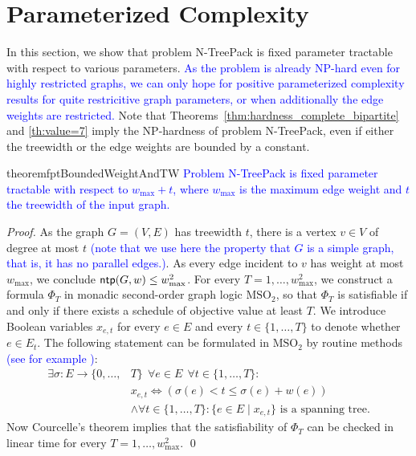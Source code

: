 \documentclass[runningheads]{llncs}
\newcommand{\set}[1]{\{ #1 \}}
\newcommand{\bigO}{\mathcal{O}}
\newcommand{\xxxNTP}{{\sc N-TreePack}}
\DeclareMathOperator{\ntp}{\text{\sf ntp}}
\newcommand{\lasse}[1]{\textcolor{blue}{#1}}
\begin{document}
\section{Parameterized Complexity}
\label{sec:parameterized}
In this section, we show that problem {\xxxNTP} is fixed parameter tractable with 
respect to various parameters. \lasse{As the problem is already NP-hard even for highly restricted graphs,
we can only hope for positive parameterized complexity results for quite restricitive graph parameters,
or when additionally the edge weights are restricted.}
Note that Theorems~\ref{thm:hardness_complete_bipartite} and \ref{th:value=7} imply the NP-hardness 
of problem {\xxxNTP}, even if either the treewidth or the edge weights are bounded by a constant. 

\begin{restatable}{theorem}{fptBoundedWeightAndTW}
\label{th:fpt_weights_and_tw_bounded}
\lasse{Problem {\xxxNTP} is fixed parameter tractable with respect to $w_{\max} + t$, where $w_{\max}$ is the maximum edge weight and $t$ the treewidth of the input graph.}
\end{restatable}
\begin{proof}
As the graph $G=(V,E)$ has treewidth $t$, there is a vertex $v\in V$ of degree at most $t$ \lasse{(note that we use here the property that $G$ is a simple graph, that is, it has no parallel edges.)}.
As every edge incident to $v$ has weight at most $w_{\max}$, we conclude $\ntp(G,w)\le w_{\max}^2$. 
For every $T=1,\ldots,w_{\max}^2$, we construct a formula $\Phi_T$ in monadic second-order 
graph logic $\text{MSO}_2$, so that $\Phi_T$ is satisfiable if and only if there exists a schedule 
of objective value at least $T$. 
We introduce Boolean variables $x_{e,t}$ for every $e\in E$ and every $t\in \{1,\dots,T\}$
to denote whether $e\in E_t$. 
The following statement can be formulated in $\text{MSO}_2$ by routine methods \lasse{(see for example \cite[chapter 7.4]{cygan2015parameterized})}:
\begin{align*}
\exists \sigma: E\to\{0,\ldots,&T\} ~~\forall e\in E ~~\forall t\in\{1,\ldots,T\}: \\
& x_{e,t} \iff \left(\sigma(e) < t \leq \sigma(e) + w(e)\right)\\
& \land \forall t\in\{1,\ldots,T\}: \set{e\in E \mid x_{e,t}} \text{ is a spanning tree.}
\end{align*}
Now Courcelle's theorem \cite{courcelle1990monadic} implies that the satisfiability of $\Phi_T$ 
can be checked in linear time for every $T=1,\ldots,w_{\max}^2$.
\qed
\end{proof}
\end{document}
